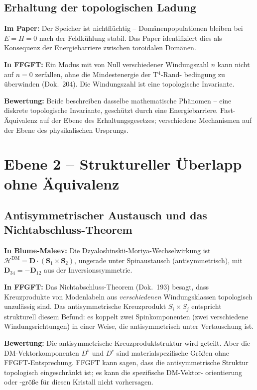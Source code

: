\subsection{Erhaltung der topologischen Ladung}

\textbf{Im Paper:} Der Speicher ist nichtflüchtig -- Domänenpopulationen
bleiben bei $E = H = 0$ nach der Feldkühlung stabil. Das Paper identifiziert
dies als Konsequenz der Energiebarriere zwischen toroidalen Domänen.

\textbf{In FFGFT:} Ein Modus mit von Null verschiedener Windungszahl $n$
kann nicht auf $n = 0$ zerfallen, ohne die Mindestenergie der T$^4$-Rand-
bedingung zu überwinden (Dok.~204). Die Windungszahl ist eine topologische
Invariante.

\textbf{Bewertung:} Beide beschreiben dasselbe mathematische Phänomen --
eine diskrete topologische Invariante, geschützt durch eine Energiebarriere.
Fast-Äquivalenz auf der Ebene des Erhaltungsgesetzes; verschiedene Mechanismen
auf der Ebene des physikalischen Ursprungs.

\section{Ebene 2 -- Struktureller Überlapp ohne Äquivalenz}

\subsection{Antisymmetrischer Austausch und das Nichtabschluss-Theorem}

\textbf{In Blume-Maleev:} Die Dzyaloshinskii-Moriya-Wechselwirkung ist
$\mathcal{H}^{\mathrm{DM}} = \mathbf{D}\cdot(\mathbf{S}_1\times\mathbf{S}_2)$,
ungerade unter Spinaustausch (antisymmetrisch), mit $\mathbf{D}_{34} = -\mathbf{D}_{12}$
aus der Inversionssymmetrie.

\textbf{In FFGFT:} Das Nichtabschluss-Theorem (Dok.~193) besagt, dass
Kreuzprodukte von Modenlabeln aus \emph{verschiedenen} Windungsklassen
topologisch unzulässig sind. Das antisymmetrische Kreuzprodukt $S_i\times S_j$
entspricht strukturell diesem Befund: es koppelt zwei Spinkomponenten (zwei
verschiedene Windungsrichtungen) in einer Weise, die antisymmetrisch unter
Vertauschung ist.

\textbf{Bewertung:} Die antisymmetrische Kreuzproduktstruktur wird geteilt.
Aber die DM-Vektorkomponenten $D^b$ und $D^c$ sind materialspezifische
Größen ohne FFGFT-Entsprechung. FFGFT kann sagen, dass die antisymmetrische
Struktur topologisch eingeschränkt ist; es kann die spezifische DM-Vektor-
orientierung oder -größe für diesen Kristall nicht vorhersagen.

